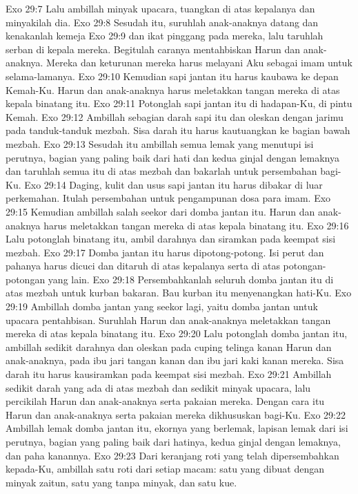 Exo 29:7  Lalu ambillah minyak upacara, tuangkan di atas kepalanya dan minyakilah dia.
Exo 29:8  Sesudah itu, suruhlah anak-anaknya datang dan kenakanlah kemeja
Exo 29:9  dan ikat pinggang pada mereka, lalu taruhlah serban di kepala mereka. Begitulah caranya mentahbiskan Harun dan anak-anaknya. Mereka dan keturunan mereka harus melayani Aku sebagai imam untuk selama-lamanya.
Exo 29:10  Kemudian sapi jantan itu harus kaubawa ke depan Kemah-Ku. Harun dan anak-anaknya harus meletakkan tangan mereka di atas kepala binatang itu.
Exo 29:11  Potonglah sapi jantan itu di hadapan-Ku, di pintu Kemah.
Exo 29:12  Ambillah sebagian darah sapi itu dan oleskan dengan jarimu pada tanduk-tanduk mezbah. Sisa darah itu harus kautuangkan ke bagian bawah mezbah.
Exo 29:13  Sesudah itu ambillah semua lemak yang menutupi isi perutnya, bagian yang paling baik dari hati dan kedua ginjal dengan lemaknya dan taruhlah semua itu di atas mezbah dan bakarlah untuk persembahan bagi-Ku.
Exo 29:14  Daging, kulit dan usus sapi jantan itu harus dibakar di luar perkemahan. Itulah persembahan untuk pengampunan dosa para imam.
Exo 29:15  Kemudian ambillah salah seekor dari domba jantan itu. Harun dan anak-anaknya harus meletakkan tangan mereka di atas kepala binatang itu.
Exo 29:16  Lalu potonglah binatang itu, ambil darahnya dan siramkan pada keempat sisi mezbah.
Exo 29:17  Domba jantan itu harus dipotong-potong. Isi perut dan pahanya harus dicuci dan ditaruh di atas kepalanya serta di atas potongan-potongan yang lain.
Exo 29:18  Persembahkanlah seluruh domba jantan itu di atas mezbah untuk kurban bakaran. Bau kurban itu menyenangkan hati-Ku.
Exo 29:19  Ambillah domba jantan yang seekor lagi, yaitu domba jantan untuk upacara pentahbisan. Suruhlah Harun dan anak-anaknya meletakkan tangan mereka di atas kepala binatang itu.
Exo 29:20  Lalu potonglah domba jantan itu, ambillah sedikit darahnya dan oleskan pada cuping telinga kanan Harun dan anak-anaknya, pada ibu jari tangan kanan dan ibu jari kaki kanan mereka. Sisa darah itu harus kausiramkan pada keempat sisi mezbah.
Exo 29:21  Ambillah sedikit darah yang ada di atas mezbah dan sedikit minyak upacara, lalu percikilah Harun dan anak-anaknya serta pakaian mereka. Dengan cara itu Harun dan anak-anaknya serta pakaian mereka dikhususkan bagi-Ku.
Exo 29:22  Ambillah lemak domba jantan itu, ekornya yang berlemak, lapisan lemak dari isi perutnya, bagian yang paling baik dari hatinya, kedua ginjal dengan lemaknya, dan paha kanannya.
Exo 29:23  Dari keranjang roti yang telah dipersembahkan kepada-Ku, ambillah satu roti dari setiap macam: satu yang dibuat dengan minyak zaitun, satu yang tanpa minyak, dan satu kue.
